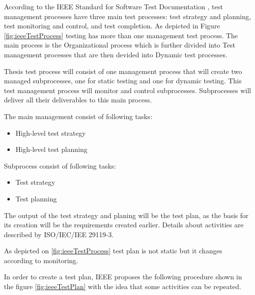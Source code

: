 According to the IEEE Standard for Software Test Documentation \cite{ieeeTestProcess}, test management processes have three main test processes: test strategy and planning, test monitoring and control, and test completion.
As depicted in Figure \ref{fig:ieeeTestProcess} testing has more than one management test process. The main process is the Organizational process which is further divided into Test management processes that are then devided into Dynamic test processes.


Thesis test process will consist of one management process that will create two managed subprocesses, one for static testing and one for dynamic testing. This test management process will monitor and control subprocesses. Subprocesses will deliver all their deliverables to this main process.

The main management consist of following tasks:
\begin{itemize}
    \item High-level test strategy
    \item High-level test planning
\end{itemize}

Subprocess consist of following tasks:
\begin{itemize}
    \item Test strategy
    \item Test planning
\end{itemize}

The output of the test strategy and planing will be the test plan, as the basis for its creation will be the requirements created earlier. Details about activities are described by ISO/IEC/IEE 29119-3.

As depicted on \ref{fig:ieeeTestProcess} test plan is not static but it changes according to monitoring.


In order to create a test plan, IEEE proposes the following procedure shown in the figure \ref{fig:ieeeTestPlan} with the idea that some activities can be repeated.

